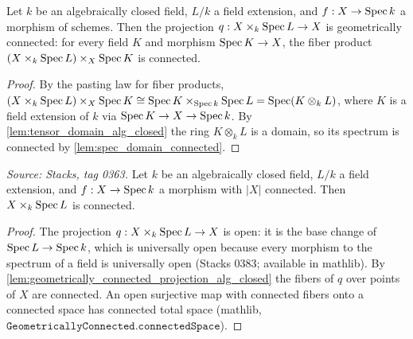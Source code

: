 \begin{lemma}\leanok
  \label{lem:geometrically_connected_projection_alg_closed}
  Let \(k\) be an algebraically closed field, \(L/k\) a field extension,
  and \(f : X \to \operatorname{Spec} k\) a morphism of schemes. Then the projection
  \(q : X \times_k \operatorname{Spec} L \to X\) is geometrically connected: for every
  field \(K\) and morphism \(\operatorname{Spec} K \to X\), the fiber product
  \((X \times_k \operatorname{Spec} L) \times_X \operatorname{Spec} K\) is connected.
\end{lemma}
\begin{proof}
  \leanok
  By the pasting law for fiber products,
  \((X \times_k \operatorname{Spec} L) \times_X \operatorname{Spec} K \cong \operatorname{Spec} K \times_{\operatorname{Spec} k}
  \operatorname{Spec} L = \operatorname{Spec} (K \otimes_k L)\), where \(K\) is a field extension of
  \(k\) via \(\operatorname{Spec} K \to X \to \operatorname{Spec} k\). By
  \cref{lem:tensor_domain_alg_closed} the ring \(K \otimes_k L\) is a
  domain, so its spectrum is connected by
  \cref{lem:spec_domain_connected}.
\end{proof}

\begin{lemma}\leanok
  \label{lem:connected_base_change_alg_closed}
  \textit{Source: Stacks, tag 0363.}
  Let \(k\) be an algebraically closed field, \(L/k\) a field extension,
  and \(f : X \to \operatorname{Spec} k\) a morphism with \(|X|\) connected. Then
  \(X \times_k \operatorname{Spec} L\) is connected.
\end{lemma}
\begin{proof}
  \leanok
  The projection \(q : X \times_k \operatorname{Spec} L \to X\) is open: it is the
  base change of \(\operatorname{Spec} L \to \operatorname{Spec} k\), which is universally open
  because every morphism to the spectrum of a field is universally open
  (Stacks 0383; available in mathlib). By
  \cref{lem:geometrically_connected_projection_alg_closed} the
  fibers of \(q\) over points of \(X\) are connected. An open
  surjective map with connected fibers onto a connected space has
  connected total space (mathlib,
  \(\texttt{GeometricallyConnected.connectedSpace}\)).
\end{proof}

